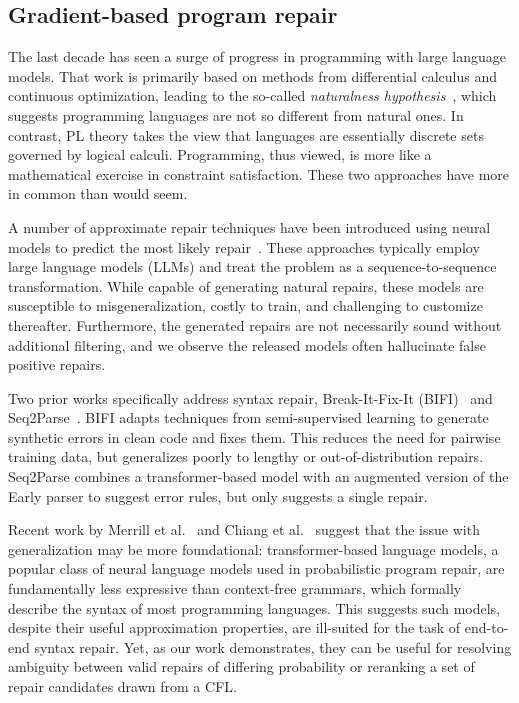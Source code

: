 \documentclass[sigplan,review,acmsmall,nonacm,screen,anonymous]{acmart}\settopmatter{printfolios=false,printccs=false,printacmref=false}
\begin{document}
\subsection{Gradient-based program repair}

The last decade has seen a surge of progress in programming with large language models. That work is primarily based on methods from differential calculus and continuous optimization, leading to the so-called \textit{naturalness hypothesis}~\cite{allamanis2018survey}, which suggests programming languages are not so different from natural ones. In contrast, PL theory takes the view that languages are essentially discrete sets governed by logical calculi. Programming, thus viewed, is more like a mathematical exercise in constraint satisfaction. These two approaches have more in common than would seem.

A number of approximate repair techniques have been introduced using neural models to predict the most likely repair~\cite{allamanis2021self, chirkova2021empirical, drain2021generating}. These approaches typically employ large language models (LLMs) and treat the problem as a sequence-to-sequence transformation. While capable of generating natural repairs, these models are susceptible to misgeneralization, costly to train, and challenging to customize thereafter. Furthermore, the generated repairs are not necessarily sound without additional filtering, and we observe the released models often hallucinate false positive repairs.

Two prior works specifically address syntax repair, Break-It-Fix-It (BIFI)~\cite{yasunaga2021break} and Seq2Parse~\cite{sakkas2022seq2parse}. BIFI adapts techniques from semi-supervised learning to generate synthetic errors in clean code and fixes them. This reduces the need for pairwise training data, but generalizes poorly to lengthy or out-of-distribution repairs. Seq2Parse combines a transformer-based model with an augmented version of the Early parser to suggest error rules, but only suggests a single repair.

Recent work by Merrill et al.~\cite{merrill2022saturated} and Chiang et al.~\cite{chiang2023tighter} suggest that the issue with generalization may be more foundational: transformer-based language models, a popular class of neural language models used in probabilistic program repair, are fundamentally less expressive than context-free grammars, which formally describe the syntax of most programming languages. This suggests such models, despite their useful approximation properties, are ill-suited for the task of end-to-end syntax repair. Yet, as our work demonstrates, they can be useful for resolving ambiguity between valid repairs of differing probability or reranking a set of repair candidates drawn from a CFL.
\end{document}
